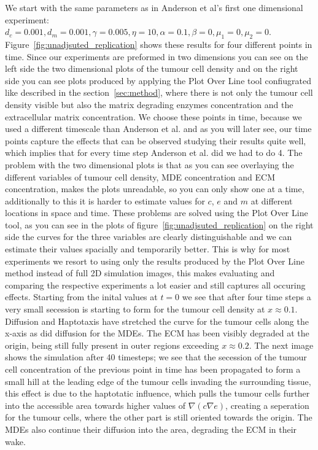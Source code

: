 We start with the same parameters as in Anderson et al's first one dimensional experiment: $d_c = 0.001, d_m = 0.001, \gamma = 0.005, \eta = 10, \alpha = 0.1, \beta = 0, \mu_1 = 0, \mu_2 = 0$. Figure~\ref{fig:unadjsuted_replication} shows these results for four different points in time. Since our experiments are preformed in two dimensions you can see on the left side the two dimensional plots of the tumour cell density and on the right side you can see plots produced by applying the Plot Over Line tool confiugrated like described in the section~\ref{sec:method}, where there is not only the tumour cell density visible but also the matrix degrading enzymes concentration and the extracellular matrix concentration. We choose these points in time, because we used a different timescale than Anderson et al. and as you will later see, our time points capture the effects that can be observed studying their results quite well, which implies that for every time step Anderson et al. did we had to do 4. The problem with the two dimensional plots is that as you can see overlaying the different variables of tumour cell density, MDE concentration and ECM concentration, makes the plots unreadable, so you can only show one at a time, additionally to this it is harder to estimate values for $c$, $e$ and $m$ at different locations in space and time. These problems are solved using the Plot Over Line tool, as you can see in the plots of figure~\ref{fig:unadjsuted_replication} on the right side the curves for the three variables are clearly distinguishable and we can estimate their values spacially and temporarily better. This is why for most experiments we resort to using only the results produced by the Plot Over Line method instead of full 2D simulation images, this makes evaluating and comparing the respective experiments a lot easier and still captures all occuring effects. \newline
Starting from the inital values at $t=0$ we see that after four time steps a very small secession is starting to form for the tumour cell density at $x\approx 0.1$. Diffusion and Haptotaxis have stretched the curve for the tumour cells along the x-axis as did diffusion for the MDEs. The ECM has  been visibly degraded at the origin, being still fully present in outer regions exceeding $x\approx 0.2$.\newline
The next image shows the simulation after 40 timesteps; we see that the secession of the tumour cell concentration of the previous point in time has been propagated to form a small hill at the leading edge of the tumour cells invading the surrounding tissue, this effect is due to the haptotatic influence, which pulls the tumour cells further into the accessible area towards higher values of $\nabla (c \nabla e)$, creating a seperation for the tumour cells, where the other part is still oriented towards the origin. The MDEs also continue their diffusion into the area, degrading the ECM in their wake.\newline 
